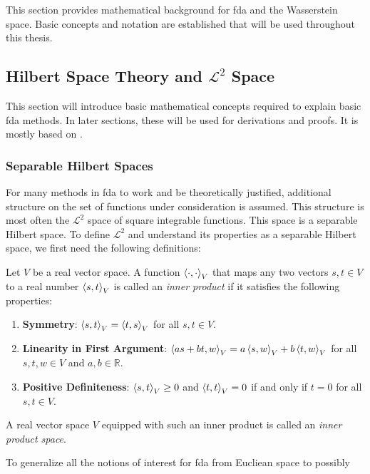 This section provides mathematical background for fda and the Wasserstein space. Basic
concepts and notation are established that will be used throughout this thesis.

\subsection{Hilbert Space Theory and $\mathcal{L}^2$ Space}
\label{sec:hilbert spaces and l2}
This section will introduce basic mathematical concepts required to explain basic fda
methods. In later sections, these will be used for derivations and proofs. It is mostly
based on \textcite[Chapter~2]{HsingEubank2015}.

\subsubsection{Separable Hilbert Spaces}
\label{sec:separable hilbert spaces}
For many methods in fda to work and be theoretically justified, additional structure on
the set of functions under consideration is assumed. This structure is most often the
$\mathcal{L}^2$ space of square integrable functions. This space is a separable Hilbert
space. To define $\mathcal{L}^2$ and understand its properties as a separable Hilbert
space, we first need the following definitions:
\begin{definition}
    \label{def:inpr}
    Let \( V \) be a real vector space. A function $\left \langle \cdot, \cdot \right \rangle_V$ that maps any
    two vectors \( s, t \in V \) to a real number \( \left \langle s, t \right \rangle_V \) is called an
    \textit{inner product} if it satisfies the following properties:
    \begin{enumerate}
        \item \textbf{Symmetry}: \( \left \langle s, t \right \rangle_V  = \left \langle t, s \right \rangle_V \) for all \( s, t \in V \).
        \item \textbf{Linearity in First Argument}: \( \left \langle as + bt, w \right \rangle_V = a \left \langle s, w \right \rangle_V + b \left \langle t, w \right \rangle_V \) for all \( s, t, w \in V \) and \( a, b \in \mathbb{R} \).
        \item \textbf{Positive Definiteness}: \( \left \langle s, t \right \rangle_V \geq 0 \) and \( \left \langle t, t \right \rangle_V = 0 \) if and only if \( t = 0 \) for all \( s, t \in V \).
    \end{enumerate}
    A real vector space \( V \) equipped with such an inner product is called an
    \textit{inner product space}.
\end{definition}
To generalize all the notions of interest for fda from Eucliean space to possibly
